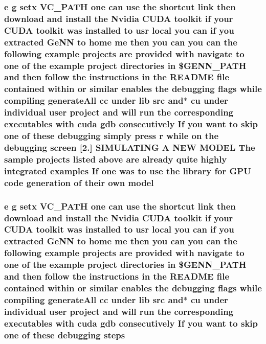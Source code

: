 \hypertarget{README_8txt_a69fd801b7213948c12d9dd7eebb3ed14}{
\subsubsection[{model}]{\setlength{\rightskip}{0pt plus 5cm}e g setx V\+C\+\_\+\+P\+A\+T\+H one can {\bf use} the shortcut link then download and install the Nvidia C\+U\+D\+A toolkit if your C\+U\+D\+A toolkit was installed {\bf to} usr local you can if you extracted {\bf Ge\+N\+N} {\bf to} home me then you can you can the following example projects are provided {\bf with} navigate {\bf to} one of the example {\bf project} directories {\bf in} \$G\+E\+N\+N\+\_\+\+P\+A\+T\+H and then follow the instructions {\bf in} the R\+E\+A\+D\+M\+E {\bf file} contained within {\bf or} similar enables the debugging flags while compiling generate\+All cc under lib src and$\ast$ cu under individual user {\bf project} and will run the corresponding executables {\bf with} {\bf cuda} gdb consecutively If you want {\bf to} skip one of these debugging simply press r while on the debugging screen \mbox{[}2.\mbox{]} S\+I\+M\+U\+L\+A\+T\+I\+N\+G A N\+E\+W M\+O\+D\+E\+L The sample projects listed above are already quite highly integrated examples If one was {\bf to} {\bf use} the library for {\bf G\+P\+U} {\bf code} generation of their own model}}\label{README_8txt_a69fd801b7213948c12d9dd7eebb3ed14}
\hypertarget{README_8txt_a23fa43bc7cc89dc7dbe6586e54044dff}{
\subsubsection[{steps}]{\setlength{\rightskip}{0pt plus 5cm}e g setx V\+C\+\_\+\+P\+A\+T\+H one can {\bf use} the shortcut link then download and install the Nvidia C\+U\+D\+A toolkit if your C\+U\+D\+A toolkit was installed {\bf to} usr local you can if you extracted {\bf Ge\+N\+N} {\bf to} home me then you can you can the following example projects are provided {\bf with} navigate {\bf to} one of the example {\bf project} directories {\bf in} \$G\+E\+N\+N\+\_\+\+P\+A\+T\+H and then follow the instructions {\bf in} the R\+E\+A\+D\+M\+E {\bf file} contained within {\bf or} similar enables the debugging flags while compiling generate\+All cc under lib src and$\ast$ cu under individual user {\bf project} and will run the corresponding executables {\bf with} {\bf cuda} gdb consecutively If you want {\bf to} skip one of these debugging steps}}\label{README_8txt_a23fa43bc7cc89dc7dbe6586e54044dff}

